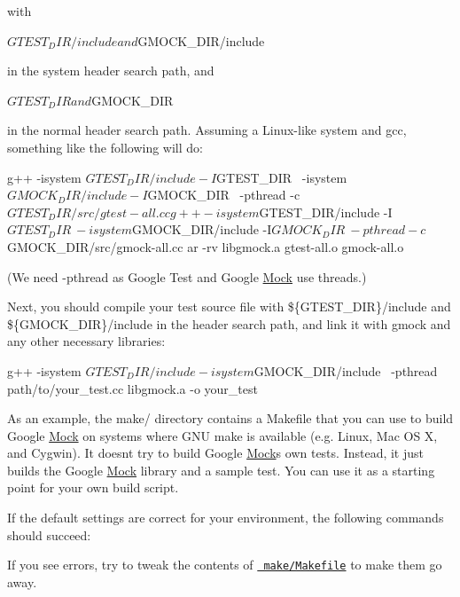 with \begin{DoxyVerb}${GTEST_DIR}/include and ${GMOCK_DIR}/include
\end{DoxyVerb}


in the system header search path, and \begin{DoxyVerb}${GTEST_DIR} and ${GMOCK_DIR}
\end{DoxyVerb}


in the normal header search path. Assuming a Linux-\/like system and gcc, something like the following will do\+: \begin{DoxyVerb}g++ -isystem ${GTEST_DIR}/include -I${GTEST_DIR} \
    -isystem ${GMOCK_DIR}/include -I${GMOCK_DIR} \
    -pthread -c ${GTEST_DIR}/src/gtest-all.cc
g++ -isystem ${GTEST_DIR}/include -I${GTEST_DIR} \
    -isystem ${GMOCK_DIR}/include -I${GMOCK_DIR} \
    -pthread -c ${GMOCK_DIR}/src/gmock-all.cc
ar -rv libgmock.a gtest-all.o gmock-all.o
\end{DoxyVerb}


(We need -\/pthread as Google Test and Google \mbox{\hyperlink{classMock}{Mock}} use threads.)

Next, you should compile your test source file with \$\{G\+T\+E\+S\+T\+\_\+\+D\+IR\}/include and \$\{G\+M\+O\+C\+K\+\_\+\+D\+IR\}/include in the header search path, and link it with gmock and any other necessary libraries\+: \begin{DoxyVerb}g++ -isystem ${GTEST_DIR}/include -isystem ${GMOCK_DIR}/include \
    -pthread path/to/your_test.cc libgmock.a -o your_test
\end{DoxyVerb}


As an example, the make/ directory contains a Makefile that you can use to build Google \mbox{\hyperlink{classMock}{Mock}} on systems where G\+NU make is available (e.\+g. Linux, Mac OS X, and Cygwin). It doesn\textquotesingle{}t try to build Google \mbox{\hyperlink{classMock}{Mock}}\textquotesingle{}s own tests. Instead, it just builds the Google \mbox{\hyperlink{classMock}{Mock}} library and a sample test. You can use it as a starting point for your own build script.

If the default settings are correct for your environment, the following commands should succeed\+: 


If you see errors, try to tweak the contents of \href{make/Makefile}{\texttt{ make/\+Makefile}} to make them go away.

